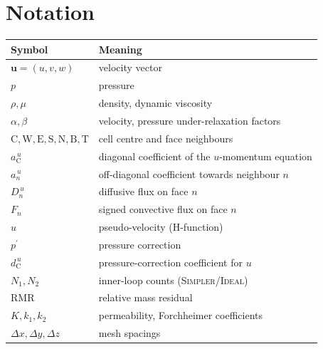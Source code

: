 \documentclass[11pt,a4paper]{article}
\newcommand{\vc}[1]{\mathbf{#1}}            %
\newcommand{\cw}{\mathrm{W}}
\newcommand{\ce}{\mathrm{E}}
\newcommand{\cn}{\mathrm{N}}
\newcommand{\cs}{\mathrm{S}}
\newcommand{\ct}{\mathrm{T}}
\newcommand{\cb}{\mathrm{B}}
\newcommand{\cc}{\mathrm{C}}
\begin{document}
\section*{Notation}
\begin{center}
\small
\begin{tabular}{@{}ll@{}}
\toprule
Symbol & Meaning\\
\midrule
$\vc{u}=(u,v,w)$ & velocity vector\\
$p$ & pressure\\
$\rho,\mu$ & density, dynamic viscosity\\
$\alpha,\beta$ & velocity, pressure under-relaxation factors\\
$\cc,\cw,\ce,\cs,\cn,\cb,\ct$ & cell centre and face neighbours\\
$a^{\,u}_{\cc}$ & diagonal coefficient of the $u$-momentum equation\\
$a^{\,u}_{n}$ & off-diagonal coefficient towards neighbour $n$\\
$D^{\,u}_{n}$ & diffusive flux on face $n$\\
$F_{n}$ & signed convective flux on face $n$\\
$\widehat{u}$ & pseudo-velocity (H-function)\\
$p^{\prime}$ & pressure correction\\
$d^{\,u}_{\cc}$ & pressure-correction coefficient for $u$\\
$N_{1},N_{2}$ & inner-loop counts (\textsc{Simpler}/\textsc{Ideal})\\
$\mathrm{RMR}$ & relative mass residual\\
$K,k_{1},k_{2}$ & permeability, Forchheimer coefficients\\
$\Delta x,\Delta y,\Delta z$ & mesh spacings\\
\bottomrule
\end{tabular}
\end{center}
\end{document}
